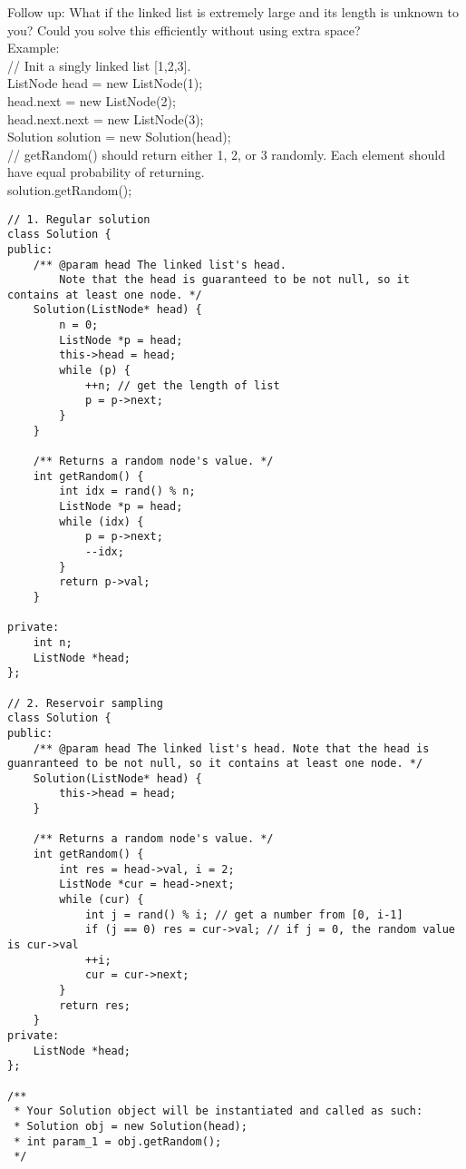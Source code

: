 Follow up:
What if the linked list is extremely large and its length is unknown to you? Could you solve this efficiently without using extra space?\\

Example:\\

// Init a singly linked list [1,2,3].\\
ListNode head = new ListNode(1);\\
head.next = new ListNode(2);\\
head.next.next = new ListNode(3);\\
Solution solution = new Solution(head);\\

// getRandom() should return either 1, 2, or 3 randomly. Each element should have equal probability of returning.\\
solution.getRandom();\\

\begin{lstlisting}
// 1. Regular solution 
class Solution {
public:
    /** @param head The linked list's head.
        Note that the head is guaranteed to be not null, so it contains at least one node. */
    Solution(ListNode* head) {
        n = 0;
        ListNode *p = head;
        this->head = head;
        while (p) {
            ++n; // get the length of list
            p = p->next;
        }
    }
    
    /** Returns a random node's value. */
    int getRandom() {
        int idx = rand() % n;
        ListNode *p = head;
        while (idx) {
            p = p->next;
            --idx;
        }
        return p->val;
    }
    
private:
    int n;
    ListNode *head;
};

// 2. Reservoir sampling
class Solution {
public:
    /** @param head The linked list's head. Note that the head is guanranteed to be not null, so it contains at least one node. */
    Solution(ListNode* head) {
        this->head = head;
    }
    
    /** Returns a random node's value. */
    int getRandom() {
        int res = head->val, i = 2;
        ListNode *cur = head->next;
        while (cur) {
            int j = rand() % i; // get a number from [0, i-1]
            if (j == 0) res = cur->val; // if j = 0, the random value is cur->val 
            ++i;
            cur = cur->next;
        }
        return res;
    }
private:
    ListNode *head;
};

/**
 * Your Solution object will be instantiated and called as such:
 * Solution obj = new Solution(head);
 * int param_1 = obj.getRandom();
 */
\end{lstlisting}


